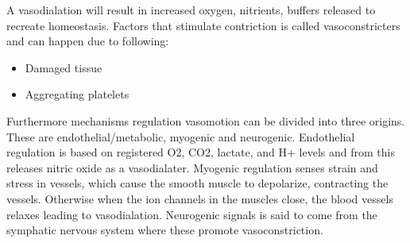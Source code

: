 A vasodialation will result in increased oxygen, nitrients, buffers released to recreate homeostasis.
Factors that stimulate contriction is called vasoconstricters and can happen due to following:\cite{martini2012} 

\begin{itemize}
	\item Damaged tissue
	\item Aggregating platelets 
\end{itemize}

Furthermore mechanisms regulation vasomotion can be divided into three origins. These are endothelial/metabolic, myogenic and neurogenic. Endothelial regulation is based on registered O2, CO2, lactate, and H+ levels and from this releases nitric oxide as a vasodialater. Myogenic regulation senses strain and stress in vessels, which cause the smooth muscle to depolarize, contracting the vessels. Otherwise when the ion channels in the muscles close, the blood vessels relaxes leading to vasodialation. Neurogenic signals is said to come from the symphatic nervous system where these promote vasoconstriction.\cite{segal2005,ince2005,nilsson2003}


